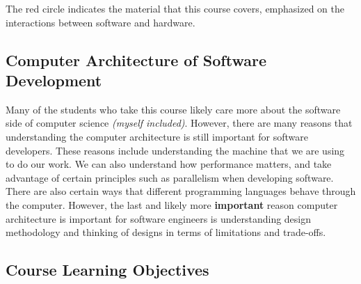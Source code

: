 \documentclass[letterpaper]{article}
\theoremstyle{remark}
\begin{document}
The red circle indicates the material that this course covers, emphasized on the interactions between software and hardware.
\subsection{Computer Architecture of Software Development}

Many of the students who take this course likely care more about the software side of computer science \textit{(myself included)}. However, there are many reasons that understanding the computer architecture is still important for software developers. These reasons include understanding the machine that we are using to do our work. We can also understand how performance matters, and take advantage of certain principles such as parallelism when developing software. There are also certain ways that different programming languages behave through the computer. However, the last and likely more \textbf{important} reason computer architecture is important for software engineers is understanding design methodology and thinking of designs in terms of limitations and trade-offs.

\subsection{Course Learning Objectives}
\end{document}
